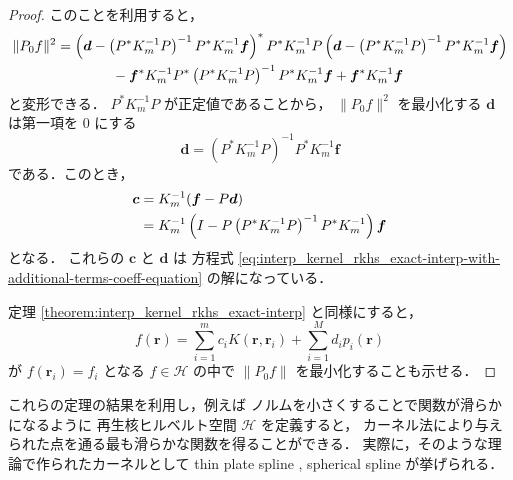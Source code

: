 \begin{proof}
    このことを利用すると，
    \begin{align}
        \|P_0 f\|^2 & =
        \left( \bm{d} - \left( P^* K_m^{-1} P \right)^{-1} P^* K_m^{-1} \bm{f} \right)^* P^* K_m^{-1} P
        \left( \bm{d} - \left( P^* K_m^{-1} P \right)^{-1} P^* K_m^{-1} \bm{f} \right)
        \notag          \\ & \hspace{4em}
        - \bm{f}^* K_m^{-1} P^* \left( P^* K_m^{-1} P \right)^{-1} P^* K_m^{-1} \bm{f}
        + \bm{f}^* K_m^{-1} \bm{f}
    \end{align}
    と変形できる．
    $P^* K_m^{-1} P$ が正定値であることから，
    $\|P_0 f\|^2$ を最小化する $\bm{d}$ は第一項を 0 にする
    \begin{equation}
        \bm{d} = \left( P^* K_m^{-1} P \right)^{-1} P^* K_m^{-1} \bm{f}
    \end{equation}
    である．このとき，
    \begin{align}
        \bm{c}
         & = K_m^{-1} (\bm{f} - P \bm{d})
        \notag                                                                                    \\
         & = K_m^{-1} \left( I - P \left( P^* K_m^{-1} P \right)^{-1} P^* K_m^{-1} \right) \bm{f}
    \end{align}
    となる．
    これらの $\bm{c}$ と $\bm{d}$ は
    方程式 \eqref{eq:interp_kernel_rkhs_exact-interp-with-additional-terms-coeff-equation}
    の解になっている．

    定理 \ref{theorem:interp_kernel_rkhs_exact-interp} と同様にすると，
    \begin{equation}
        f(\bm{r}) = \sum_{i = 1}^{m} c_i K(\bm{r}, \bm{r}_i) + \sum_{i=1}^M d_i p_i(\bm{r})
    \end{equation}
    が $f(\bm{r}_i) = f_i$ となる $f \in \mathcal{H}$ の中で $\|P_0 f\|$ を最小化することも示せる．
\end{proof}

これらの定理の結果を利用し，例えば
ノルムを小さくすることで関数が滑らかになるように
再生核ヒルベルト空間 $\mathcal{H}$ を定義すると，
カーネル法により与えられた点を通る最も滑らかな関数を得ることができる．
実際に，そのような理論で作られたカーネルとして
thin plate spline \cite{Ghosh2010},
spherical spline \cite{Wahba1981}
が挙げられる．
